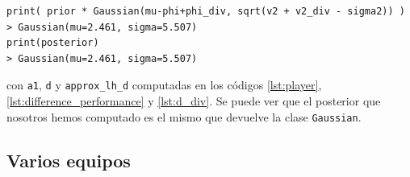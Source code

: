 \documentclass[a4paper,11pt]{book}
\theoremstyle{definition}
\begin{document}
\begin{lstlisting}[captionpos=b,backgroundcolor=\color{all},label=lst:posterior_s1_approx, caption={Accediendo al posterior aproximado},belowskip=0cm]
print( prior * Gaussian(mu-phi+phi_div, sqrt(v2 + v2_div - sigma2)) )
> Gaussian(mu=2.461, sigma=5.507)
print(posterior)
> Gaussian(mu=2.461, sigma=5.507)
\end{lstlisting}
%
con \texttt{a1}, \texttt{d} y \texttt{approx\_lh\_d} computadas en los c\'odigos \ref{lst:player}, \ref{lst:difference_performance} y \ref{lst:d_div}.
%
Se puede ver que el posterior que nosotros hemos computado es el mismo que devuelve la clase \texttt{Gaussian}.

\subsection{Varios equipos} \label{sec:iterative_posterior}
\end{document}
